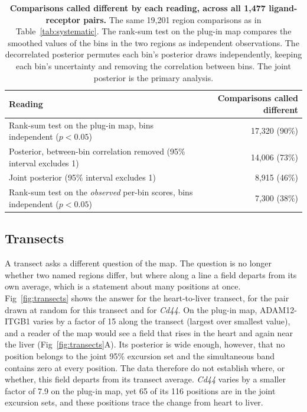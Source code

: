 \documentclass[10pt,letterpaper]{article}
\begin{document}
\begin{table}[!ht]
\centering
\caption{{\bf Comparisons called different by each reading, across all 1,477 ligand-receptor pairs.} The same 19,201 region comparisons as in Table~\ref{tab:systematic}. The rank-sum test on the plug-in map compares the smoothed values of the bins in the two regions as independent observations. The decorrelated posterior permutes each bin's posterior draws independently, keeping each bin's uncertainty and removing the correlation between bins. The joint posterior is the primary analysis.}
\label{tab:readings}
\begin{tabular}{|l|r|}
  \hline
  Reading & Comparisons called different \\
  \hline
  Rank-sum test on the plug-in map, bins independent ($p<0.05$) & 17,320 (90\%) \\
  Posterior, between-bin correlation removed (95\% interval excludes 1) & 14,006 (73\%) \\
  Joint posterior (95\% interval excludes 1) & 8,915 (46\%) \\
  Rank-sum test on the \textit{observed} per-bin scores, bins independent ($p<0.05$) & 7,300 (38\%) \\
  \hline
\end{tabular}
\end{table}

\subsection*{Transects}

A transect asks a different question of the map. The question is no longer whether two named regions differ, but where along a line a field departs from its own average, which is a statement about many positions at once. Fig~\ref{fig:transects} shows the answer for the heart-to-liver transect, for the pair drawn at random for this transect and for \textit{Cd44}. On the plug-in map, ADAM12-ITGB1 varies by a factor of 15 along the transect (largest over smallest value), and a reader of the map would see a field that rises in the heart and again near the liver (Fig~\ref{fig:transects}A). Its posterior is wide enough, however, that no position belongs to the joint 95\% excursion set and the simultaneous band contains zero at every position. The data therefore do not establish where, or whether, this field departs from its transect average. \textit{Cd44} varies by a smaller factor of 7.9 on the plug-in map, yet 65 of its 116 positions are in the joint excursion sets, and these positions trace the change from heart to liver.
\end{document}
